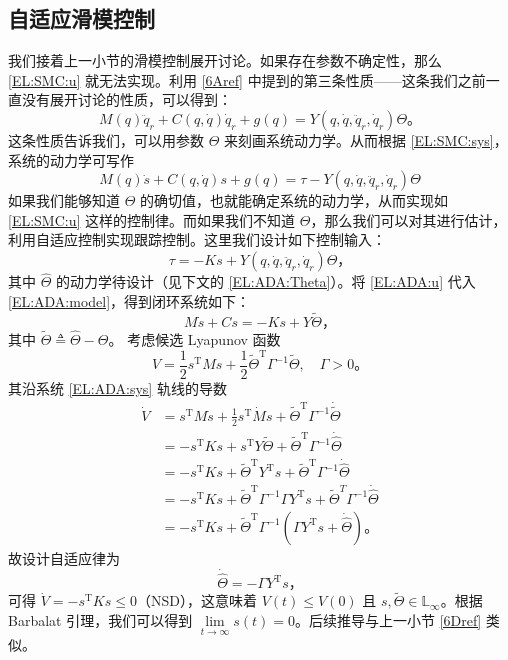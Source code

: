 \subsection{自适应滑模控制}\label{6Eref}

我们接着上一小节的滑模控制展开讨论。如果存在参数不确定性，那么 \eqref{EL:SMC:u} 就无法实现。利用 \ref{6Aref} 中提到的第三条性质——这条我们之前一直没有展开讨论的性质，可以得到：
\[
    M (q) \ddot{q}_r + C (q, \dot{q}) \dot{q}_r +g(q)= Y (q, \dot{q}, \ddot{q}_r, \dot{q}_r) \Theta \text{。}
\]
这条性质告诉我们，可以用参数 $\Theta$ 来刻画系统动力学。从而根据 \eqref{EL:SMC:sys}，系统的动力学可写作
\begin{equation} \label{EL:ADA:model}
    M(q) \dot{s} + C(q, \dot{q}) s +g(q)= \tau - Y (q, \dot{q}, \ddot{q}_r, \dot{q}_r) \Theta
\end{equation}
如果我们能够知道 $\Theta$ 的确切值，也就能确定系统的动力学，从而实现如 \eqref{EL:SMC:u} 这样的控制律。而如果我们不知道 $\Theta$，那么我们可以对其进行估计，利用自适应控制实现跟踪控制。这里我们设计如下控制输入：
\begin{equation} \label{EL:ADA:u}
    \tau = - K s + Y (q, \dot{q}, \ddot{q}_r, \dot{q}_r) \hat{\Theta} \text{，}
\end{equation}
其中 $\hat{\Theta}$ 的动力学待设计（见下文的 \eqref{EL:ADA:Theta}）。将 \eqref{EL:ADA:u} 代入 \eqref{EL:ADA:model}，得到闭环系统如下：
\begin{equation} \label{EL:ADA:sys}
    M \dot{s} + C s = - K s + Y \tilde{\Theta} \text{，}
\end{equation}
其中 $\tilde{\Theta} \triangleq \hat{\Theta} - \Theta$。
考虑候选 Lyapunov 函数
\[
    V = \frac{1}{2} s^\mathrm{T} M  s + \frac{1}{2} \tilde{\Theta}^\mathrm{T} \Gamma^{-1} \tilde{\Theta}, \quad \Gamma > 0 \text{。}
\]
其沿系统 \eqref{EL:ADA:sys} 轨线的导数
\begin{align*}
    \dot{V} & = s^\mathrm{T} M \dot{s} + \frac{1}{2} s^\mathrm{T} \dot{M} s + \tilde{\Theta}^\mathrm{T} \Gamma^{-1} \dot{\tilde{\Theta}} \\
    & = - s^\mathrm{T} K  s + s^\mathrm{T} Y \tilde{\Theta} + \tilde{\Theta}^\mathrm{T} \Gamma^{- 1} \dot{\hat{\Theta}}\\
    & = - s^\mathrm{T} K  s + \tilde{\Theta}^\mathrm{T}   Y^\mathrm{T} s + \tilde{\Theta}^\mathrm{T} \Gamma^{- 1} \dot{\hat{\Theta}}\\
    & = - s^\mathrm{T} K  s + \tilde{\Theta}^\mathrm{T} \Gamma^{- 1} \Gamma  Y^\mathrm{T} s + \tilde{\Theta}^T \Gamma^{- 1} \dot{\hat{\Theta}}\\
    & = - s^\mathrm{T} K  s + \tilde{\Theta}^\mathrm{T} \Gamma^{- 1} (\Gamma  Y^\mathrm{T} s + \dot{\hat{\Theta}} ) \text{。}
\end{align*}
故设计自适应律为
\begin{equation} \label{EL:ADA:Theta}
    \dot{\hat{\Theta}} = - \Gamma Y^\mathrm{T} s \text{，}
\end{equation}
可得 $\dot{V} = - s^\mathrm{T} K s \leq 0$（NSD），这意味着 $V (t) \leq V (0)$ 且 $s, \tilde{\Theta} \in \mathbb{L}_{\infty}$。根据 Barbalat 引理，我们可以得到 $\lim\limits_{t \rightarrow \infty} s (t) = 0$。后续推导与上一小节 \ref{6Dref} 类似。

